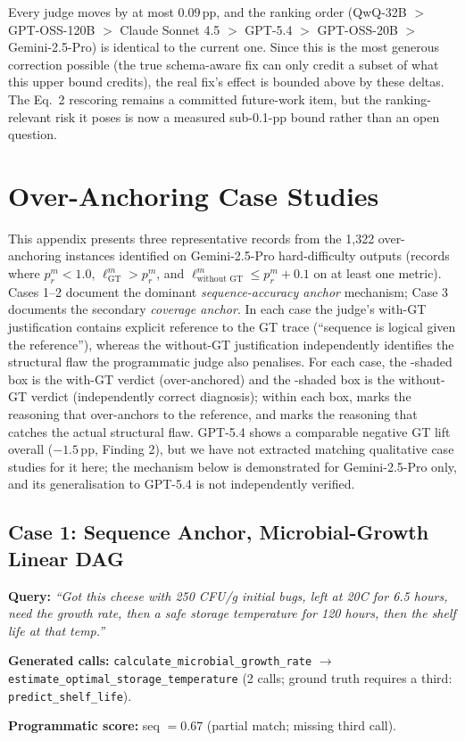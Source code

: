 Every judge moves by at most $0.09$\,pp, and the ranking order (QwQ-32B $>$ GPT-OSS-120B $>$ Claude Sonnet 4.5 $>$ GPT-5.4 $>$ GPT-OSS-20B $>$ Gemini-2.5-Pro) is identical to the current one. Since this is the most generous correction possible (the true schema-aware fix can only credit a subset of what this upper bound credits), the real fix's effect is bounded above by these deltas. The Eq.~2 rescoring remains a committed future-work item, but the ranking-relevant risk it poses is now a measured sub-0.1-pp bound rather than an open question.

\section{Over-Anchoring Case Studies}
\label{app:anchoring-cases}

This appendix presents three representative records from the 1,322 over-anchoring instances identified on Gemini-2.5-Pro hard-difficulty outputs (records where $p^m_r < 1.0$, $\ell^m_{\text{GT}} > p^m_r$, and $\ell^m_{\text{without GT}} \leq p^m_r + 0.1$ on at least one metric). Cases 1--2 document the dominant \emph{sequence-accuracy anchor} mechanism; Case 3 documents the secondary \emph{coverage anchor}. In each case the judge's with-GT justification contains explicit reference to the GT trace (``sequence is logical given the reference''), whereas the without-GT justification independently identifies the structural flaw the programmatic judge also penalises. For each case, the -shaded box is the with-GT verdict (over-anchored) and the -shaded box is the without-GT verdict (independently correct diagnosis); within each box,  marks the reasoning that over-anchors to the reference, and  marks the reasoning that catches the actual structural flaw. GPT-5.4 shows a comparable negative GT lift overall ($-1.5$\,pp, Finding 2), but we have not extracted matching qualitative case studies for it here; the mechanism below is demonstrated for Gemini-2.5-Pro only, and its generalisation to GPT-5.4 is not independently verified.

\subsection*{Case 1: Sequence Anchor, Microbial-Growth Linear DAG}
\begin{querybox}
\footnotesize
\textbf{Query:} \emph{``Got this cheese with 250 CFU/g initial bugs, left at 20\textdegree C for 6.5 hours, need the growth rate, then a safe storage temperature for 120 hours, then the shelf life at that temp.''}

\textbf{Generated calls:} \texttt{calculate\_microbial\_growth\_rate} $\to$ \texttt{estimate\_optimal\_storage\_temperature} (2 calls; ground truth requires a third: \texttt{predict\_shelf\_life}).

\textbf{Programmatic score:} seq $= 0.67$ (partial match; missing third call).
\end{querybox}


